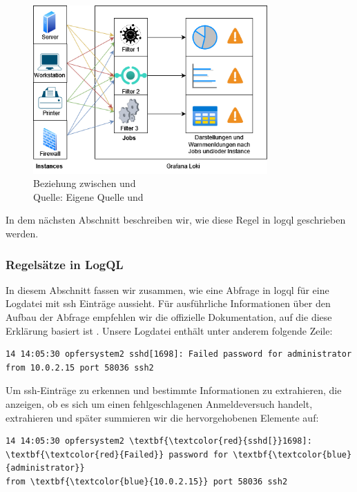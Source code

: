 \begin{figure}[H]
   \centering
   \includegraphics[width=0.8\textwidth]{assets/Instance_Jobs.drawio.png}
   \caption[Beziehung zwischen  und ]
   {Beziehung zwischen  und  \\Quelle: Eigene Quelle und \citep{Prometheus_JobInstance}}
   \centering
\end{figure}

In dem nächsten Abschnitt beschreiben wir, wie diese Regel in \gls{logql} geschrieben werden.

\newpage
\subsubsection{Regelsätze in LogQL}
In diesem Abschnitt fassen wir zusammen, wie eine Abfrage in \gls{logql} für eine Logdatei mit \gls{ssh} Einträge aussieht. Für ausführliche Informationen über den Aufbau der Abfrage empfehlen wir die offizielle Dokumentation, auf die diese Erklärung basiert ist \citep{Grafana_logql}. Unsere Logdatei enthält unter anderem folgende Zeile:

{
\begin{Verbatim}[frame=single]
14 14:05:30 opfersystem2 sshd[1698]: Failed password for administrator 
from 10.0.2.15 port 58036 ssh2
\end{Verbatim}
}

Um \gls{ssh}-Einträge zu erkennen und bestimmte Informationen zu extrahieren, die anzeigen, ob es sich um einen fehlgeschlagenen Anmeldeversuch handelt, extrahieren und später summieren wir die hervorgehobenen Elemente auf:

{
\begin{Verbatim}[commandchars=\\\{\},frame=single]
14 14:05:30 opfersystem2 \textbf{\textcolor{red}{sshd[}}1698]: \textbf{\textcolor{red}{Failed}} password for \textbf{\textcolor{blue}{administrator}}
from \textbf{\textcolor{blue}{10.0.2.15}} port 58036 ssh2
\end{Verbatim}
}

